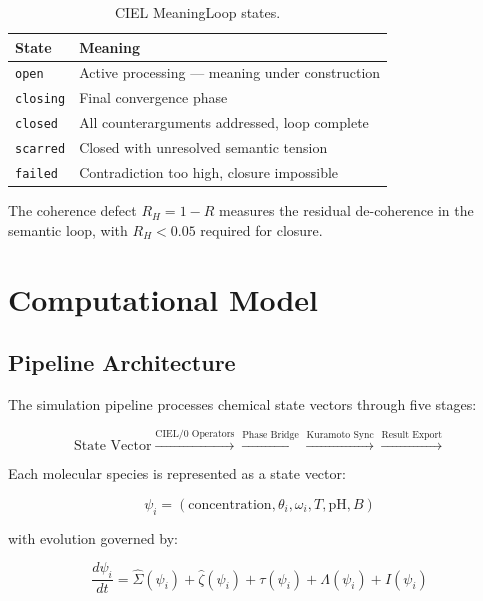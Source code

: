 \documentclass[11pt,a4paper]{article}
\begin{document}
\begin{table}[h]
\centering
\begin{tabular}{ll}
\toprule
State & Meaning \\
\midrule
\texttt{open} & Active processing --- meaning under construction \\
\texttt{closing} & Final convergence phase \\
\texttt{closed} & All counterarguments addressed, loop complete \\
\texttt{scarred} & Closed with unresolved semantic tension \\
\texttt{failed} & Contradiction too high, closure impossible \\
\bottomrule
\end{tabular}
\caption{CIEL MeaningLoop states.}
\label{tab:ciel_states}
\end{table}

The coherence defect $R_H = 1 - R$ measures the residual de-coherence in the semantic loop, with $R_H < 0.05$ required for closure.

\section{Computational Model}

\subsection{Pipeline Architecture}

The simulation pipeline processes chemical state vectors through five stages:

\begin{equation}
\text{State Vector} \xrightarrow{\text{CIEL/0 Operators}} \xrightarrow{\text{Phase Bridge}} \xrightarrow{\text{Kuramoto Sync}} \xrightarrow{\text{Result Export}}
\end{equation}

Each molecular species is represented as a state vector:

\begin{equation}
\psi_i = (\text{concentration}, \theta_i, \omega_i, T, \text{pH}, B)
\end{equation}

with evolution governed by:

\begin{equation}
\frac{d\psi_i}{dt} = \hat{\Sigma}(\psi_i) + \hat{\zeta}(\psi_i) + \tau(\psi_i) + \Lambda(\psi_i) + I(\psi_i)
\end{equation}
\end{document}
